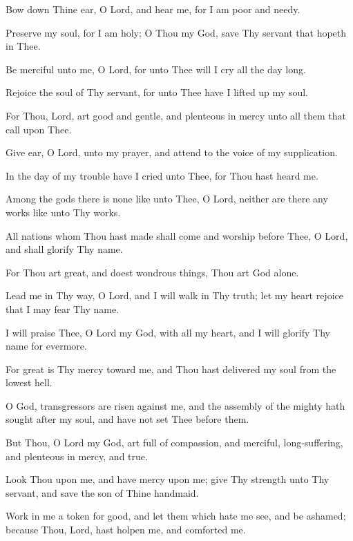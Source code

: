 Bow down Thine ear, O Lord, and hear me, for I am poor and needy.

Preserve my soul, for I am holy; O Thou my God, save Thy servant that hopeth in Thee.

Be merciful unto me, O Lord, for unto Thee will I cry all the day long.

Rejoice the soul of Thy servant, for unto Thee have I lifted up my soul.

For Thou, Lord, art good and gentle, and plenteous in mercy unto all them that call upon Thee.

Give ear, O Lord, unto my prayer, and attend to the voice of my supplication.

In the day of my trouble have I cried unto Thee, for Thou hast heard me.

Among the gods there is none like unto Thee, O Lord, neither are there any works like unto Thy works.

All nations whom Thou hast made shall come and worship before Thee, O Lord, and shall glorify Thy name.

For Thou art great, and doest wondrous things, Thou art God alone.

Lead me in Thy way, O Lord, and I will walk in Thy truth; let my heart rejoice that I may fear Thy name.

I will praise Thee, O Lord my God, with all my heart, and I will glorify Thy name for evermore.

For great is Thy mercy toward me, and Thou hast delivered my soul from the lowest hell.

O God, transgressors are risen against me, and the assembly of the mighty hath sought after my soul, and have not set Thee before them.

But Thou, O Lord my God, art full of compassion, and merciful, long-suffering, and plenteous in mercy, and true.

Look Thou upon me, and have mercy upon me; give Thy strength unto Thy servant, and save the son of Thine handmaid.

Work in me a token for good, and let them which hate me see, and be ashamed; because Thou, Lord, hast holpen me, and comforted me.
